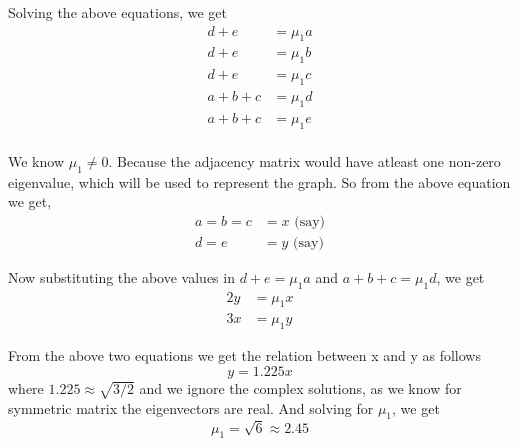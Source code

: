 \documentclass[12pt,a4paper]{article}
\begin{document}
Solving the above equations, we get
\begin{align*}
d + e &= \mu_1a \\
d + e &= \mu_1b \\
d + e &= \mu_1c \\
a + b + c &= \mu_1d \\
a + b + c &= \mu_1e \\
\end{align*}

We know $\mu_1 \neq 0$. Because the adjacency matrix would have atleast one non-zero eigenvalue, which will be used to represent the graph. So from the above equation we get,
\begin{align*}
    a = b = c &= x \text{ (say)} \\
    d = e &= y \text{ (say)}
\end{align*}

Now substituting the above values in $d + e = \mu_1a$ and $a+b+c = \mu_1d$, we get
\begin{align*}
    2y &= \mu_1x \\
    3x &= \mu_1y
\end{align*}

From the above two equations we get the relation between x and y as follows
\begin{equation}
    y = 1.225x
\end{equation}
where $1.225 \approx \sqrt{3/2}$ and we ignore the complex solutions, as we know for symmetric matrix the eigenvectors are real. And solving for $\mu_1$, we get
\begin{equation}
    \mu_1 = \sqrt{6} \approx 2.45
\end{equation}
\end{document}
